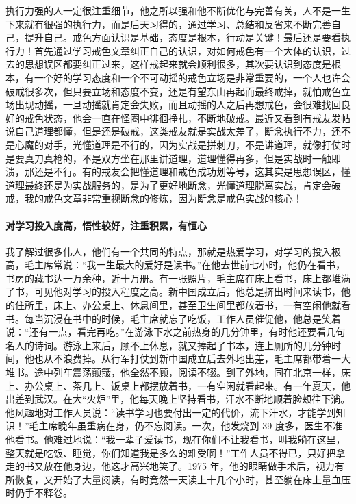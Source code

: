 执行力强的人一定很注重细节，他之所以强和他不断优化与完善有关，人不是一生下来就有很强的执行力，而是后天习得的，通过学习、总结和反省来不断完善自己，提升自己。戒色方面认识是基础，态度是根本，行动是关键！最后还是要看执行力！首先通过学习戒色文章纠正自己的认识，对如何戒色有一个大体的认识，过去的思想误区都要纠正过来，这样戒起来就会顺利很多，其次要认识到态度是根本，有一个好的学习态度和一个不可动摇的戒色立场是非常重要的，一个人也许会破戒很多次，但只要立场和态度不变，还是有望东山再起而最终戒掉，就怕戒色立场出现动摇，一旦动摇就肯定会失败，而且动摇的人之后再想戒色，会很难找回良好的戒色状态，他会一直在怪圈中徘徊挣扎，不断地破戒。最近又看到有戒友发帖说自己道理都懂，但是还是破戒，这类戒友就是实战太差了，断念执行不力，还不是心魔的对手，光懂道理是不行的，因为实战是拼刺刀，不是讲道理，就像打仗时是要真刀真枪的，不是双方坐在那里讲道理，道理懂得再多，但是实战时一触即溃，那还是不行。有的戒友会把懂道理和戒色成功划等号，这其实是思想误区，懂道理最终还是为实战服务的，是为了更好地断念，光懂道理脱离实战，肯定会破戒，我的戒色文章非常重视断念的修炼，因为断念是戒色实战的核心！

\paragraph{对学习投入度高，悟性较好，注重积累，有恒心}

我了解过很多伟人，他们有一个共同的特点，那就是热爱学习，对学习的投入极高，毛主席常说：“我一生最大的爱好是读书。”在他去世前七小时，他仍在看书，书房的藏书达一万余种，近十万册。有一张照片，毛主席在床上看书，床上都堆满了书，可见他对学习的投入程度之高。新中国成立后，他总是挤出时间来读书，他的住所里，床上、办公桌上、休息间里，甚至卫生间里都放着书，一有空闲他就看书。每当沉浸在书中的时候，毛主席就忘了吃饭，工作人员催促他，他总是笑着说：“还有一点，看完再吃。”在游泳下水之前热身的几分钟里，有时他还要看几句名人的诗词。游泳上来后，顾不上休息，就又捧起了书本，连上厕所的几分钟时间，他也从不浪费掉。从行军打仗到新中国成立后去外地出差，毛主席都带着一大堆书。途中列车震荡颠簸，他全然不顾，阅读不辍。到了外地，同在北京一样，床上、办公桌上、茶几上、饭桌上都摆放着书，一有空闲就看起来。有一年夏天，他出差到武汉。在大“火炉”里，他每天晚上坚持看书，汗水不断地顺着脸颊往下淌。他风趣地对工作人员说：“读书学习也要付出一定的代价，流下汗水，才能学到知识！”毛主席晚年虽重病在身，仍不忘阅读。一次，他发烧到 39 度多，医生不准他看书。他难过地说：“我一辈子爱读书，现在你们不让我看书，叫我躺在这里，整天就是吃饭、睡觉，你们知道我是多么的难受啊！”工作人员不得已，只好把拿走的书又放在他身边，他这才高兴地笑了。1975 年，他的眼睛做手术后，视力有所恢复，又开始了大量阅读，有时竟然一天读上十几个小时，甚至躺在床上量血压时仍手不释卷。

